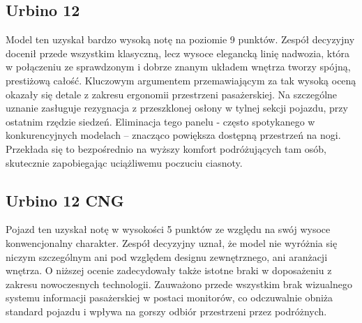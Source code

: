 \subsection{Urbino 12}
Model ten uzyskał bardzo wysoką notę na poziomie 9 punktów. Zespół decyzyjny docenił przede wszystkim klasyczną, lecz wysoce elegancką linię nadwozia, która w połączeniu ze sprawdzonym i dobrze znanym układem wnętrza tworzy spójną, prestiżową całość. Kluczowym argumentem przemawiającym za tak wysoką oceną okazały się detale z zakresu ergonomii przestrzeni pasażerskiej. Na szczególne uznanie zasługuje rezygnacja z przeszklonej osłony w tylnej sekcji pojazdu, przy ostatnim rzędzie siedzeń. Eliminacja tego panelu - często spotykanego w konkurencyjnych modelach – znacząco powiększa dostępną przestrzeń na nogi. Przekłada się to bezpośrednio na wyższy komfort podróżujących tam osób, skutecznie zapobiegając uciążliwemu poczuciu ciasnoty.

\subsection{Urbino 12 CNG}
Pojazd ten uzyskał notę w wysokości 5 punktów ze względu na swój wysoce konwencjonalny charakter. Zespół decyzyjny uznał, że model nie wyróżnia się niczym szczególnym ani pod względem designu zewnętrznego, ani aranżacji wnętrza. O niższej ocenie zadecydowały także istotne braki w doposażeniu z zakresu nowoczesnych technologii. Zauważono przede wszystkim brak wizualnego systemu informacji pasażerskiej w postaci monitorów, co odczuwalnie obniża standard pojazdu i wpływa na gorszy odbiór przestrzeni przez podróżnych.

